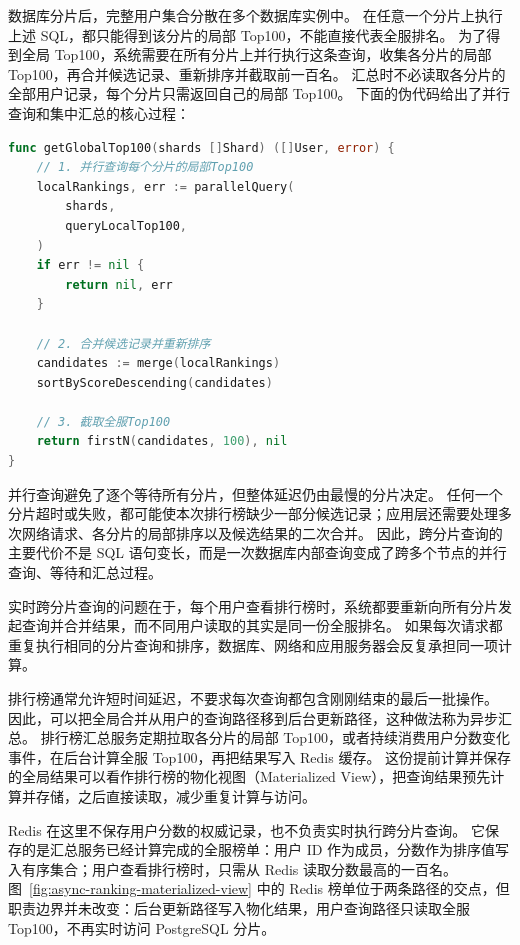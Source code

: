 数据库分片后，完整用户集合分散在多个数据库实例中。
在任意一个分片上执行上述 SQL，都只能得到该分片的局部 Top100，不能直接代表全服排名。
为了得到全局 Top100，系统需要在所有分片上并行执行这条查询，收集各分片的局部 Top100，再合并候选记录、重新排序并截取前一百名。
汇总时不必读取各分片的全部用户记录，每个分片只需返回自己的局部 Top100。
下面的伪代码给出了并行查询和集中汇总的核心过程：

\begin{tcolorbox}[title=跨分片排行榜的并行汇总伪代码]
\begin{lstlisting}[style=codeblock, language=go]
func getGlobalTop100(shards []Shard) ([]User, error) {
    // 1. 并行查询每个分片的局部Top100
    localRankings, err := parallelQuery(
        shards,
        queryLocalTop100,
    )
    if err != nil {
        return nil, err
    }

    // 2. 合并候选记录并重新排序
    candidates := merge(localRankings)
    sortByScoreDescending(candidates)

    // 3. 截取全服Top100
    return firstN(candidates, 100), nil
}
\end{lstlisting}
\end{tcolorbox}

并行查询避免了逐个等待所有分片，但整体延迟仍由最慢的分片决定。
任何一个分片超时或失败，都可能使本次排行榜缺少一部分候选记录；应用层还需要处理多次网络请求、各分片的局部排序以及候选结果的二次合并。
因此，跨分片查询的主要代价不是 SQL 语句变长，而是一次数据库内部查询变成了跨多个节点的并行查询、等待和汇总过程。

实时跨分片查询的问题在于，每个用户查看排行榜时，系统都要重新向所有分片发起查询并合并结果，而不同用户读取的其实是同一份全服排名。
如果每次请求都重复执行相同的分片查询和排序，数据库、网络和应用服务器会反复承担同一项计算。

排行榜通常允许短时间延迟，不要求每次查询都包含刚刚结束的最后一批操作。
因此，可以把全局合并从用户的查询路径移到后台更新路径，这种做法称为异步汇总。
排行榜汇总服务定期拉取各分片的局部 Top100，或者持续消费用户分数变化事件，在后台计算全服 Top100，再把结果写入 Redis 缓存。
这份提前计算并保存的全局结果可以看作排行榜的物化视图（Materialized View），把查询结果预先计算并存储，之后直接读取，减少重复计算与访问。

Redis 在这里不保存用户分数的权威记录，也不负责实时执行跨分片查询。
它保存的是汇总服务已经计算完成的全服榜单：用户 ID 作为成员，分数作为排序值写入有序集合；用户查看排行榜时，只需从 Redis 读取分数最高的一百名。
图~\ref{fig:async-ranking-materialized-view} 中的 Redis 榜单位于两条路径的交点，但职责边界并未改变：后台更新路径写入物化结果，用户查询路径只读取全服 Top100，不再实时访问 PostgreSQL 分片。

